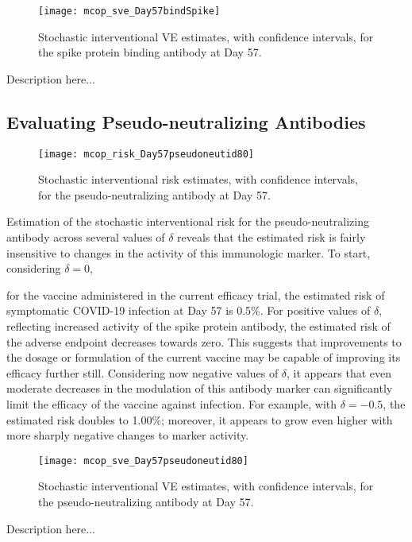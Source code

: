 \begin{figure}[H]
  \centering
  \texttt{[image: mcop\_sve\_Day57bindSpike]}
  \caption{Stochastic interventional VE estimates, with confidence intervals,
    for the spike protein binding antibody at Day 57.}
  \label{fig:marker1-sve-day57}
\end{figure}

Description here...

\subsection{Evaluating Pseudo-neutralizing Antibodies}\label{psna-day57}

\begin{figure}[H]
  \centering
  \texttt{[image: mcop\_risk\_Day57pseudoneutid80]}
  \caption{Stochastic interventional risk estimates, with confidence intervals,
  for the pseudo-neutralizing antibody at Day 57.}
  \label{fig:marker4-risk-day57}
\end{figure}

Estimation of the stochastic interventional risk for the pseudo-neutralizing
antibody across several values of $\delta$ reveals that the estimated risk is
fairly insensitive to changes in the activity of this immunologic marker. To
start, considering $\delta = 0$,

for the vaccine administered in the current efficacy trial, the
estimated risk of symptomatic COVID-19 infection at Day 57 is 0.5\%. For
positive values of $\delta$, reflecting increased activity of the spike protein
antibody, the estimated risk of the adverse endpoint decreases towards zero.
This suggests that improvements to the dosage or formulation of the current
vaccine may be capable of improving its efficacy further still. Considering now
negative values of $\delta$, it appears that even moderate decreases in the
modulation of this antibody marker can significantly limit the efficacy of the
vaccine against infection. For example, with $\delta = -0.5$, the estimated risk
doubles to 1.00\%; moreover, it appears to grow even higher with more sharply
negative changes to marker activity.
\begin{figure}[H]
  \centering
  \texttt{[image: mcop\_sve\_Day57pseudoneutid80]}
  \caption{Stochastic interventional VE estimates, with confidence intervals,
  for the pseudo-neutralizing antibody at Day 57.}
  \label{fig:marker4-sve-day57}
\end{figure}

Description here...
